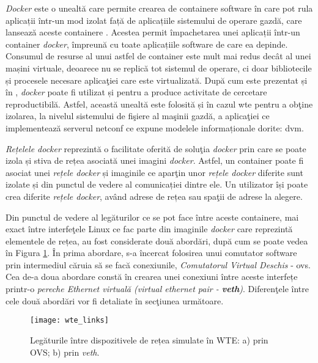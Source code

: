 \textit{Docker} este o unealtă care permite crearea de containere software în care pot rula aplicații într-un mod izolat față de aplicațiile sistemului de operare gazdă, care lansează aceste containere \cite{merkel2014docker}. Acestea permit împachetarea unei aplicații într-un container \textit{docker}, împreună cu toate aplicațiile software de care ea depinde. Consumul de resurse al unui astfel de container este mult mai redus decât al unei mașini virtuale, deoarece nu se replică tot sistemul de operare, ci doar bibliotecile și procesele necesare aplicaţiei care este virtualizată. După cum este prezentat și în \cite{chamberlain2014using}, \textit{docker} poate fi utilizat și pentru a produce activitate de cercetare reproductibilă. Astfel, această unealtă este folosită și în cazul \gls{wte} pentru a obţine izolarea, la nivelul sistemului de fişiere al maşinii gazdă, a aplicaţiei ce implementează serverul \gls{netconf} ce expune modelele informaționale dorite: \gls{dvm}.

\textit{Rețelele docker} reprezintă o facilitate oferită de soluţia \textit{docker} prin care se poate izola și stiva de rețea asociată unei imagini \textit{docker}. Astfel, un container poate fi asociat unei \textit{rețele docker} și imaginile ce aparţin unor \textit{rețele docker} diferite sunt izolate și din punctul de vedere al comunicației dintre ele. Un utilizator își poate crea diferite \textit{rețele docker}, având adrese de rețea sau spaţii de adrese la alegere.

Din punctul de vedere al legăturilor ce se pot face între aceste containere, mai exact între interfeţele Linux ce fac parte din imaginile \textit{docker} care reprezintă elementele de rețea, au fost considerate două abordări, după cum se poate vedea în Figura \ref{fig:wte_links}. În prima abordare, s-a încercat folosirea unui comutator software prin intermediul căruia să se facă conexiunile, \textit{Comutatorul Virtual Deschis} - \gls{ovs}. Cea de-a doua abordare constă în crearea unei conexiuni între aceste interfețe printr-o \textit{pereche Ethernet virtuală (virtual ethernet pair - \textbf{veth})}. Diferenţele între cele două abordări vor fi detaliate în secţiunea următoare.

\begin{figure}[h]
	\centering
	\texttt{[image: wte\_links]}
	\caption{Legăturile între dispozitivele de rețea simulate în WTE: a) prin OVS; b) prin \textit{veth}.}
	\label{fig:wte_links}
\end{figure}

